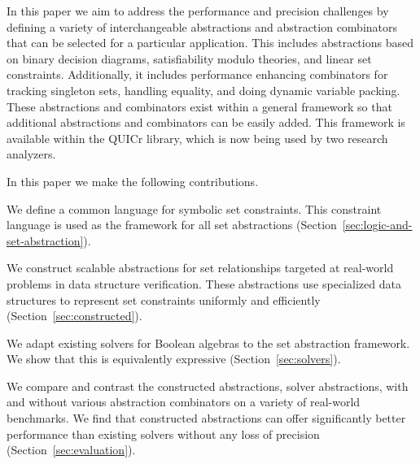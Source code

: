 In this paper we aim to address the performance and precision challenges
by defining a variety of interchangeable abstractions and abstraction
combinators that can be selected for a particular application.
This includes abstractions based on binary decision diagrams,
satisfiability modulo theories, and linear set constraints.
Additionally, it includes performance enhancing combinators for tracking
singleton sets, handling equality, and doing dynamic variable packing.
These abstractions and combinators exist within a general framework so
that additional abstractions and combinators can be easily added.
This framework is available within the QUICr library, which is now being
used by two research analyzers.

In this paper we make the following contributions.
\begin{compactitem}
\item We define a common language for symbolic set constraints.
  This constraint language is used as the framework for all set
  abstractions (Section~\ref{sec:logic-and-set-abstraction}).
\item We construct scalable abstractions for set relationships
  targeted at real-world problems in data structure verification.
  These abstractions use specialized data structures to represent set
  constraints uniformly and efficiently (Section~\ref{sec:constructed}).
\item We adapt existing solvers for Boolean algebras to the set abstraction
  framework.
  We show that this is equivalently expressive (Section~\ref{sec:solvers}).
\item We compare and contrast the constructed abstractions, solver
  abstractions, with and without various abstraction combinators on a
  variety of real-world benchmarks.
  We find that constructed abstractions can offer significantly better
  performance than existing solvers without any loss of precision
  (Section~\ref{sec:evaluation}).
\end{compactitem}